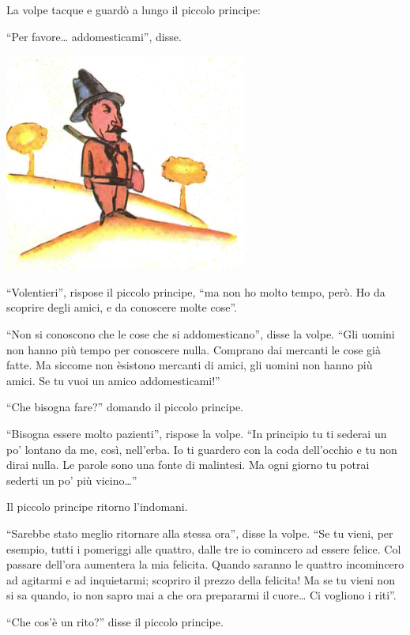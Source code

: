 \documentclass[11pt]{scrbook}
\begin{document}
La volpe tacque e guardò a lungo il piccolo principe:

``Per favore\ldots{} addomesticami'', disse.

\begin{center}
\includegraphics{img/myslivec}
\end{center}

``Volentieri'', rispose il piccolo principe, ``ma non ho molto tempo,
però. Ho da scoprire degli amici, e da conoscere molte cose''.

``Non si conoscono che le cose che si addomesticano'', disse la volpe.
``Gli uomini non hanno più tempo per conoscere nulla. Comprano dai
mercanti le cose già fatte. Ma siccome non èsistono mercanti di amici,
gli uomini non hanno più amici. Se tu vuoi un amico addomesticami!''

``Che bisogna fare?'' domando il piccolo principe.

``Bisogna essere molto pazienti'', rispose la volpe. ``In principio tu
ti sederai un po' lontano da me, così, nell'erba. Io ti guardero con la
coda dell'occhio e tu non dirai nulla. Le parole sono una fonte di
malintesi. Ma ogni giorno tu potrai sederti un po' più vicino\ldots{}''

Il piccolo principe ritorno l'indomani.

``Sarebbe stato meglio ritornare alla stessa ora'', disse la volpe. ``Se
tu vieni, per esempio, tutti i pomeriggi alle quattro, dalle tre io
comincero ad essere felice. Col passare dell'ora aumentera la mia
felicita. Quando saranno le quattro incomincero ad agitarmi e ad
inquietarmi; scopriro il prezzo della felicita! Ma se tu vieni non si sa
quando, io non sapro mai a che ora prepararmi il cuore\ldots{} Ci
vogliono i riti''.

``Che cos'è un rito?'' disse il piccolo principe.
\end{document}

